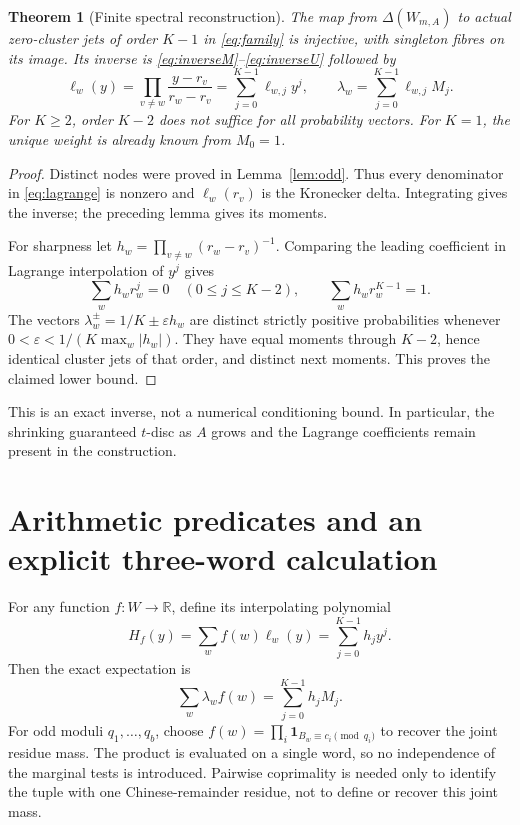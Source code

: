 \documentclass[11pt]{amsart}
\newtheorem{theorem}{Theorem}[section]
\theoremstyle{remark}\newtheorem{remark}[theorem]{Remark}
\newcommand{\R}{\mathbb R}
\begin{document}
\begin{theorem}[Finite spectral reconstruction]\label{thm:main}
The map from $\Delta(W_{m,A})$ to actual zero-cluster jets of order
$K-1$ in \eqref{eq:family} is injective, with singleton fibres on its
image. Its inverse is \eqref{eq:inverseM}--\eqref{eq:inverseU} followed by
\begin{equation}\label{eq:lagrange}
 \ell_w(y)=\prod_{v\ne w}\frac{y-r_v}{r_w-r_v}
 =\sum_{j=0}^{K-1}\ell_{w,j}y^j,\qquad
 \lambda_w=\sum_{j=0}^{K-1}\ell_{w,j}M_j.
\end{equation}
For $K\ge2$, order $K-2$ does not suffice for all probability vectors.
For $K=1$, the unique weight is already known from $M_0=1$.
\end{theorem}
\begin{proof}
Distinct nodes were proved in Lemma~\ref{lem:odd}. Thus every denominator
in \eqref{eq:lagrange} is nonzero and $\ell_w(r_v)$ is the Kronecker
delta. Integrating gives the inverse; the preceding lemma gives its moments.

For sharpness let $h_w=\prod_{v\ne w}(r_w-r_v)^{-1}$. Comparing the
leading coefficient in Lagrange interpolation of $y^j$ gives
\[
 \sum_w h_w r_w^j=0\quad(0\le j\le K-2),\qquad
 \sum_w h_w r_w^{K-1}=1.
\]
The vectors $\lambda_w^\pm=1/K\pm\varepsilon h_w$ are distinct strictly
positive probabilities whenever
$0<\varepsilon<1/(K\max_w|h_w|)$. They have equal moments through
$K-2$, hence identical cluster jets of that order, and distinct next
moments. This proves the claimed lower bound.
\end{proof}

This is an exact inverse, not a numerical conditioning bound. In particular,
the shrinking guaranteed $t$-disc as $A$ grows and the Lagrange coefficients
remain present in the construction.

\section{Arithmetic predicates and an explicit three-word calculation}
For any function $f:W\to\R$, define its interpolating polynomial
\[
 H_f(y)=\sum_w f(w)\ell_w(y)=\sum_{j=0}^{K-1}h_jy^j.
\]
Then the exact expectation is
\begin{equation}\label{eq:predicate}
 \sum_w\lambda_w f(w)=\sum_{j=0}^{K-1}h_jM_j.
\end{equation}
For odd moduli $q_1,\ldots,q_b$, choose
$f(w)=\prod_i\mathbf 1_{B_w\equiv c_i\pmod{q_i}}$ to recover the
joint residue mass. The product is evaluated on a single word, so no
independence of the marginal tests is introduced. Pairwise coprimality is
needed only to identify the tuple with one Chinese-remainder residue,
not to define or recover this joint mass.
\end{document}
